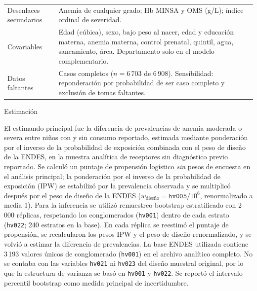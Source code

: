 \documentclass[man,11pt,donotrepeattitle,floatsintext]{apa7}
\makeatletter
\renewcommand{\subsection}{\@startsection{subsection}{2}{\z@}%
    {\b@level@two@skip}{\e@level@two@skip}%
    {\normalfont\normalsize\bfseries\raggedright}}
\makeatother
\begin{document}
\begin{table}[htbp]
\begin{tabular}{p{3.1cm}p{12.2cm}}
		Desenlaces secundarios & Anemia de cualquier grado; Hb MINSA y OMS (g/L); índice ordinal de severidad.                                                                                                                                                                                                                                                                                                               \\
		Covariables            & Edad (cúbica), sexo, bajo peso al nacer, edad y educación materna, anemia materna, control prenatal, quintil, agua, saneamiento, área. Departamento solo en el modelo complementario.                                                                                                                                                                                                       \\
		Datos faltantes        & Casos completos ($n=6\,703$ de 6\,908). Sensibilidad: reponderación por probabilidad de ser caso completo y exclusión de tomas faltantes.                                                                                                                                                                                                                                                                           \\
		\bottomrule
	\end{tabular}
	\endgroup
\end{table}

\subsection{Estimación}

El estimando principal fue la diferencia de prevalencias de anemia moderada o severa entre niños con y sin consumo reportado, estimada mediante ponderación por el inverso de la probabilidad de exposición combinada con el peso de diseño de la ENDES, en la muestra analítica de receptores sin diagnóstico previo reportado. Se calculó un puntaje de propensión logístico \emph{sin} pesos de encuesta en el análisis principal; la ponderación por el inverso de la probabilidad de exposición (IPW) se estabilizó por la prevalencia observada y se multiplicó después por el peso de diseño de la ENDES ($w_{\text{diseño}}=\texttt{hv005}/10^6$, renormalizado a media 1). Para la inferencia se utilizó remuestreo bootstrap estratificado con 2\,000 réplicas, respetando los conglomerados (\texttt{hv001}) dentro de cada estrato (\texttt{hv022}; 240 estratos en la base). En cada réplica se reestimó el puntaje de propensión, se recalcularon los pesos IPW y el peso de diseño renormalizado, y se volvió a estimar la diferencia de prevalencias. La base ENDES utilizada contiene 3\,193 valores únicos de conglomerado (\texttt{hv001}) en el archivo analítico completo. No se contaba con las variables \texttt{hv021} ni \texttt{hv023} del diseño muestral original, por lo que la estructura de varianza se basó en \texttt{hv001} y \texttt{hv022}. Se reportó el intervalo percentil bootstrap como medida principal de incertidumbre.
\end{document}
